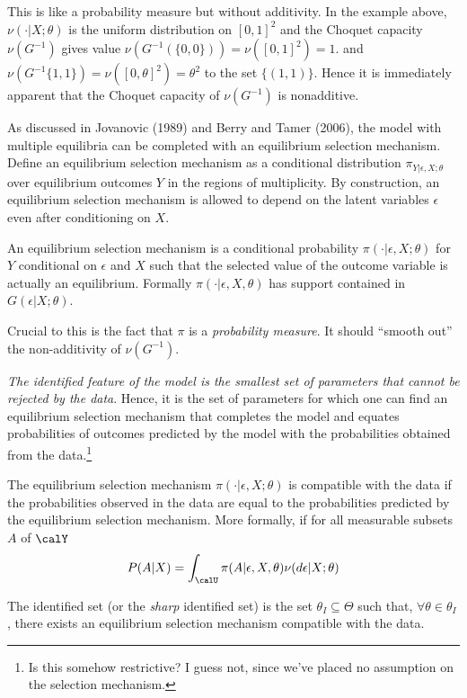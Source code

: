 This is like a probability measure but without additivity. In the example above, $\nu(\cdot| X;\theta)$ is the uniform distribution on $[0,1]^2$ and the Choquet capacity $\nu(G^{-1})$ gives value $\nu(G^{-1}(\{0,0\})) = \nu([0,1]^2) = 1$. and $\nu(G^{-1}\{1,1\}) = \nu([0,\theta]^2)= \theta^2$ to the set $\{(1,1)\}$. Hence it is immediately apparent that the Choquet capacity of $\nu(G^{-1})$ is nonadditive.

As discussed in Jovanovic (1989) and Berry and Tamer (2006), the model with multiple equilibria can be completed with an equilibrium selection mechanism. Define an equilibrium selection mechanism as a conditional distribution $\pi_{Y|\epsilon, X;\theta}$ over equilibrium outcomes $Y$ in the regions of multiplicity. By construction, an equilibrium selection mechanism is allowed to depend on the latent variables $\epsilon$ even after conditioning on $X$.

\begin{definition}
	\label{def:GH-2}
	An equilibrium selection mechanism is a conditional probability $\pi(\cdot|\epsilon, X;\theta)$ for $Y$ conditional on $\epsilon$ and $X$ such that the selected value of the outcome variable is actually an equilibrium. Formally $\pi(\cdot|\epsilon, X,\theta)$ has support contained in $G(\epsilon|X;\theta)$.
\end{definition}

Crucial to this is the fact that $\pi$ is a \textit{probability measure}. It should ``smooth out'' the non-additivity of $\nu(G^{-1})$.

\emph{The identified feature of the model is the smallest set of parameters that cannot be rejected by the data}. Hence, it is the set of parameters for which one can find an equilibrium selection mechanism that completes the model and equates probabilities of outcomes predicted by the model with the probabilities obtained from the data.\footnote{Is this somehow restrictive? I guess not, since we've placed no assumption on the selection mechanism.}

\begin{definition}
	\label{def:GH-3}
	The equilibrium selection mechanism $\pi(\cdot|\epsilon, X;\theta)$ is compatible with the data if the probabilities observed in the data are equal to the probabilities predicted by the equilibrium selection mechanism. More formally, if for all measurable subsets $A$ of $\calY$
	\[P(A|X) = \int_\calU \pi(A|\epsilon, X,\theta) \nu(d\epsilon |X;\theta)\]
\end{definition}
\begin{definition}
	\label{def:GH-4}
	The identified set (or the \emph{sharp} identified set) is the set $\theta_I \subseteq\Theta$ such that, $\forall \theta \in \theta_I$, there exists an equilibrium selection mechanism compatible with the data.
\end{definition}

